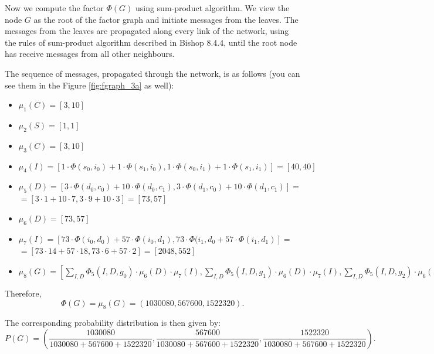 \documentclass[11pt,a4paper]{article}
\begin{document}
Now we compute the factor $\Phi(G)$ using sum-product algorithm. We view the node $G$ as the root of the factor graph and initiate messages from the leaves. The messages from the leaves are propagated along every link of the network, using the rules of sum-product algorithm described in Bishop 8.4.4, until the root node has receive messages from all other neighbours.

The sequence of messages, propagated through the network, is as follows (you can see them in the Figure \ref{fig:fgraph_3a} as well):
\begin{itemize}
	\item $ \mu_1(C) = [3, 10] $
	\item $ \mu_2(S) = [1, 1] $
	\item $ \mu_3(C) = [3, 10] $
	\item $ \mu_4(I) = [1 \cdot \Phi(s_0, i_0) + 1 \cdot \Phi(s_1, i_0), 1 \cdot \Phi(s_0, i_1) + 1 \cdot \Phi(s_1, i_1)] = [40, 40] $
	\item $ \mu_5(D) = [3 \cdot \Phi(d_0, c_0) + 10 \cdot \Phi(d_0, c_1), 3 \cdot \Phi(d_1, c_0) + 10 \cdot \Phi(d_1, c_1)] = $ \\
	$ = [3 \cdot 1 + 10 \cdot 7, 3 \cdot 9 + 10 \cdot 3] = [73, 57] $
	\item $ \mu_6(D) = [73, 57]$
	\item $ \mu_7(I) = [73 \cdot \Phi(i_0, d_0) + 57 \cdot \Phi(i_0, d_1), 73 \cdot \Phi(i_1, d_0+ 57 \cdot \Phi(i_1, d_1)] = $ \\
	$ = [73 \cdot 14 + 57 \cdot 18, 73 \cdot 6 + 57 \cdot 2] = [2048, 552] $
	\item $ \mu_8(G) = [\sum_{I, D} \Phi_5(I, D, g_0) \cdot \mu_6(D) \cdot \mu_7(I) , \sum_{I, D} \Phi_5(I, D, g_1) \cdot \mu_6(D) \cdot \mu_7(I), \sum_{I, D} \Phi_5(I, D, g_2) \cdot \mu_6(D) \cdot \mu_7(I)] = [84 \cdot 73 \cdot 40 + 72 \cdot 73 \cdot 40 + 216 \cdot 57 \cdot 40 + 36 \cdot 57 \cdot 40, 42 \cdot 73 \cdot 40 + 54 \cdot 73 \cdot 40 + 108 \cdot 57 \cdot 40 + 18 \cdot 57 \cdot 40, 294 \cdot 73 \cdot 40 + 54 \cdot 73 \cdot 40 + 216 \cdot 57 \cdot 40 + 6 \cdot 57 \cdot 40] = [1030080, 567600, 1522320]$
\end{itemize}

	Therefore, $$ \Phi(G) = \mu_8(G) = (1030080, 567600, 1522320). $$
	
	The corresponding probability distribution is then given by:
	$$ P(G) = \left(\frac{1030080}{1030080 + 567600 + 1522320}, \frac{567600}{1030080 + 567600 + 1522320}, \frac{1522320}{1030080 + 567600 + 1522320}\right). $$
	
\end{document}
